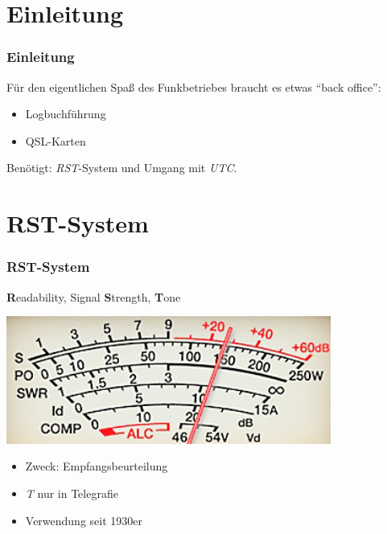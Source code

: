 

\subtitle{Betriebstechnik/Vorschriften 13: \\
          RST-System, UTC, Logbuch, QSL-Karte \\[2em]}
\date{Stand 17.12.2015}


\section{Einleitung}

\begin{frame}
    \frametitle{Einleitung}

    Für den eigentlichen Spaß des Funkbetriebes braucht es etwas ``back
    office'': 

    \begin{itemize}
        \item Logbuchführung
        \item QSL-Karten
    \end{itemize}

    \vspace{1cm}

    Benötigt: \emph{RST}-System und Umgang mit \emph{UTC}.

\end{frame}

\section{RST-System}

\begin{frame}
    \frametitle{RST-System}

    \textbf{R}eadability, Signal \textbf{S}trength, \textbf{T}one

    \begin{center}
        \includegraphics[width=0.8\textwidth]{e10/S-Meter.jpg}
        \tiny \hyperlink{refs}{\cite{wc}}
    \end{center}

    \begin{itemize}
        \item Zweck: Empfangsbeurteilung
        \item \emph{T} nur in Telegrafie
        \item Verwendung seit 1930er
    \end{itemize}

\end{frame}

